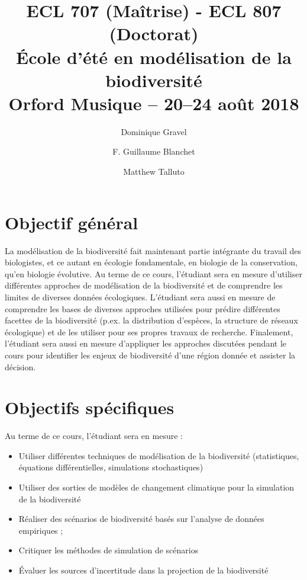 \documentclass[12]{article}
\title{ECL 707 (Maîtrise) - ECL 807 (Doctorat) \\ École d'été en modélisation de la biodiversité\\Orford Musique -- 20--24 août 2018}
\date {}
\author[1]{Dominique Gravel}
\author[1]{F. Guillaume Blanchet}
\author[2]{Matthew Talluto}
\affil[1]{Départment de biologie, Université de Sherbrooke}
\affil[2]{Leibniz-Institute of freshwater ecology and inland fisheries}
\begin{document}
	\maketitle

	\section*{Objectif général}

  La modélisation de la biodiversité fait maintenant partie intégrante du
  travail des biologistes, et ce autant en écologie fondamentale, en biologie de
  la conservation, qu'en biologie évolutive. Au terme de ce cours, l'étudiant
  sera en mesure d'utiliser différentes approches de modélisation de la
  biodiversité et de comprendre les limites de diverses données écologiques.
  L'étudiant sera aussi en mesure de comprendre les bases de diverses approches
  utilisées pour prédire différentes facettes de la biodiversité (p.ex. la
  distribution d'espèces, la structure de réseaux écologique) et de les utiliser
  pour ses propres travaux de recherche. Finalement, l'étudiant sera aussi en
  mesure d'appliquer les approches discutées pendant le cours pour identifier
  les enjeux de biodiversité d'une région donnée et assister la décision.

	\section*{Objectifs spécifiques}

	Au terme de ce cours, l'étudiant sera en mesure :

	\begin{itemize}
	\renewcommand{\labelitemi}{$\bullet$}

  \item  Utiliser différentes techniques de modélisation de la biodiversité (statistiques, équations différentielles, simulations stochastiques)

  \item Utiliser des sorties de modèles de changement climatique pour la simulation de la biodiversité

  \item Réaliser des scénarios de biodiversité basés sur l'analyse de données empiriques ;

  \item Critiquer les méthodes de simulation de scénarios

  \item Évaluer les sources d'incertitude dans la projection de la biodiversité

	\end{itemize}
\end{document}
